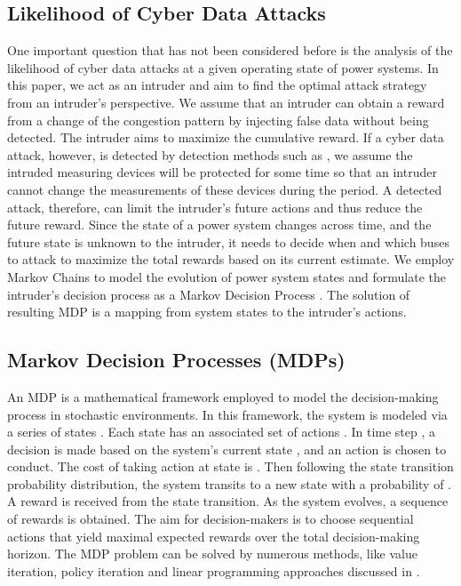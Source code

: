 \documentclass[conference,letterpaper,10pt]{IEEEtran}
\begin{document}
\subsection{Likelihood of Cyber Data Attacks}\label{sec:problem}
One important question that has not been considered before is the analysis of the likelihood of cyber data attacks at a given operating state of power systems. 
In this paper, we act as an intruder and aim to find the optimal attack strategy from an intruder's perspective.
We assume that an intruder can obtain a reward from a change of the congestion pattern by injecting false data without being detected.  The intruder aims to maximize the cumulative reward. If a cyber data attack, however, is detected by detection methods such as \cite{SJ13,LEDEH14,WGGCFSR14}, we assume the intruded measuring devices will be protected for some time so that an intruder cannot change the measurements of these devices during the period. A detected attack, therefore, can limit the intruder's future actions and thus reduce the future reward. Since the state of a power system changes across time, and the future state is unknown to the intruder, it needs to decide  when and which buses to attack to maximize the total rewards based on its current estimate.  We employ Markov Chains \cite{MP94} to model the evolution of power system states and formulate the intruder's decision process as a Markov Decision Process \cite{MP94}. The solution of resulting MDP is a mapping from system states to the intruder's actions.





\subsection{Markov Decision Processes (MDPs)}\label{sec:MDP}
An MDP is a mathematical framework employed to model the  decision-making process in stochastic environments. In this framework, the system is modeled via a series of states . Each state  has an associated set of actions . In time step , a decision is made based on the system's current state , and an action  is chosen to conduct. The cost of taking action  at state  is . Then following the state transition probability distribution, the system transits to a new state  with a probability of . A reward  is received from the state transition. 
As the system evolves, a sequence of rewards is obtained. 
The aim for decision-makers is to choose sequential actions that yield maximal expected rewards over the total decision-making horizon. The MDP problem can be solved by numerous methods, like value iteration, policy iteration and linear programming approaches discussed in \cite{MP94}. 
\end{document}
